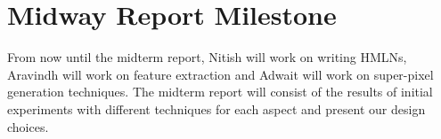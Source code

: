 \documentclass{article} %
\begin{document}
\vspace{-0.125in}
\section{Midway Report Milestone}
\vspace{-0.125in}
From now until the midterm report, Nitish will work on writing HMLNs, Aravindh will work on feature extraction and Adwait will work on super-pixel generation techniques. The midterm report will consist of the results of initial experiments with different techniques for each aspect and present our design choices.

\vspace{-.125in}


\end{document}
